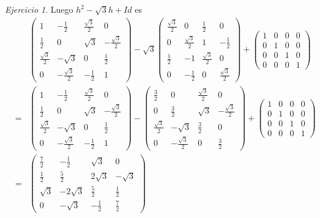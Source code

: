 \documentclass[11pt,a4paper]{article}
\theoremstyle{definition}
\theoremstyle{remark}
\newtheorem{exc}{Ejercicio}
\begin{document}
\begin{exc}
			Luego $ h^2-\sqrt{3}h+Id $ es
			\begin{eqnarray}
			& & \begin{pmatrix}
   	    	1 & -\frac{1}{2} & \frac{\sqrt{3}}{2} & 0
   	    	\\ \frac{1}{2} & 0 & \sqrt{3} & -\frac{\sqrt{3}}{2} 
   	    	\\ \frac{\sqrt{3}}{2} & -\sqrt{3} & 0 & \frac{1}{2}
   	    	\\ 0 & -\frac{\sqrt{3}}{2} & -\frac{1}{2} & 1
   	    	\end{pmatrix}\nonumber -
   	    	\sqrt{3}\begin{pmatrix}
   	    	\frac{\sqrt{3}}{2} & 0 & \frac{1}{2} & 0
   	    	\\ 0 & \frac{\sqrt{3}}{2} & 1 & -\frac{1}{2} 
   	    	\\ \frac{1}{2} & -1 & \frac{\sqrt{3}}{2} & 0
   	    	\\ 0 & -\frac{1}{2} & 0 & \frac{\sqrt{3}}{2}
   	    	\end{pmatrix}
   	    	+ \begin{pmatrix}
			1 & 0 & 0 & 0
			\\0 & 1 & 0 & 0
			\\0 & 0 & 1 & 0
			\\0 & 0 & 0 & 1
			\end{pmatrix}
			\\& = &
			\begin{pmatrix}
   	    	1 & -\frac{1}{2} & \frac{\sqrt{3}}{2} & 0
   	    	\\ \frac{1}{2} & 0 & \sqrt{3} & -\frac{\sqrt{3}}{2} 
   	    	\\ \frac{\sqrt{3}}{2} & -\sqrt{3} & 0 & \frac{1}{2}
   	    	\\ 0 & -\frac{\sqrt{3}}{2} & -\frac{1}{2} & 1
   	    	\end{pmatrix}\nonumber -
   	    	\begin{pmatrix}
   	    	\frac{3}{2} & 0 & \frac{\sqrt{3}}{2} & 0
   	    	\\ 0 & \frac{3}{2} & \sqrt{3} & -\frac{\sqrt{3}}{2} 
   	    	\\ \frac{\sqrt{3}}{2} & -\sqrt{3} & \frac{3}{2} & 0
   	    	\\ 0 & -\frac{\sqrt{3}}{2} & 0 & \frac{3}{2}
   	    	\end{pmatrix}
   	    	+ \begin{pmatrix}
			1 & 0 & 0 & 0
			\\0 & 1 & 0 & 0
			\\0 & 0 & 1 & 0
			\\0 & 0 & 0 & 1
			\end{pmatrix}
			\\& = &
			\begin{pmatrix}
			\frac{7}{2} & -\frac{1}{2} & \sqrt{3} & 0
			\\\frac{1}{2} & \frac{5}{2} & 2\sqrt{3} & -\sqrt{3}
			\\\sqrt{3} & -2\sqrt{3} & \frac{5}{2} & \frac{1}{2}
			\\0 & -\sqrt{3} & -\frac{1}{2} & \frac{7}{2} 
			\end{pmatrix}\nonumber 
			\end{eqnarray}		
			

\end{exc}
\end{document}
